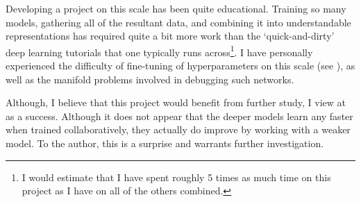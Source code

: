 \documentclass[english,a4paper,oneside]{amsart}
\theoremstyle{definition}
\begin{document}
Developing a project on this scale has been quite educational. Training so many models, gathering all of the resultant data, and combining it into understandable representations has required quite a bit more work than the `quick-and-dirty' deep learning tutorials that one typically runs across\footnote{I would estimate that I have spent roughly 5 times as much time on this project as I have on all of the others combined.}. I have personally experienced the difficulty of fine-tuning of hyperparameters on this scale (see ), as well as the manifold problems involved in debugging such networks. 

Although, I believe that this project would benefit from further study, I view at as a success. Although it does not appear that the deeper models learn any faster when trained collaboratively, they actually do improve by working with a weaker model. To the author, this is a surprise and warrants further investigation.

\end{document}
